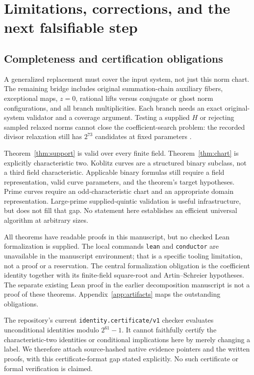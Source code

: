 \section{Limitations, corrections, and the next falsifiable step}
\subsection{Completeness and certification obligations}
A generalized replacement must cover the input system, not just this norm
chart. The remaining bridge includes original summation-chain auxiliary
fibers, exceptional maps, $z=0$, rational lifts versus conjugate or
ghost norm configurations, and all branch multiplicities. Each branch
needs an exact original-system validator and a coverage argument. Testing
a supplied $H$ or rejecting sampled relaxed norms cannot close the
coefficient-search problem: the recorded divisor relaxation still has
$2^{73}$ candidates at fixed parameters .

Theorem~\ref{thm:support} is valid over every finite field.
Theorem~\ref{thm:chart} is explicitly characteristic two. Koblitz curves are
a structured binary subclass, not a third field characteristic. Applicable
binary formulas still require a field representation, valid curve parameters,
and the theorem's target hypotheses. Prime curves require an odd-characteristic
chart and an appropriate domain representation. Large-prime supplied-quintic
validation is useful infrastructure, but does not fill that gap.
No statement here establishes an efficient universal algorithm at arbitrary
sizes.

All theorems have readable proofs in this manuscript, but no checked Lean
formalization is supplied. The local commands \texttt{lean} and
\texttt{conductor} are unavailable in the manuscript environment; that is a
specific tooling limitation, not a proof or a reservation. The central
formalization obligation is the coefficient identity together with its
finite-field square-root and Artin--Schreier hypotheses. The separate existing
Lean proof in the earlier decomposition manuscript is not a proof of these
theorems. Appendix~\ref{app:artifacts} maps the outstanding obligations.

The repository's current \texttt{identity.certificate/v1} checker evaluates
unconditional identities modulo $2^{61}-1$. It cannot faithfully certify the
characteristic-two identities or conditional implications here by merely
changing a label. We therefore attach source-hashed native evidence pointers
and the written proofs, with this certificate-format gap stated explicitly.
No such certificate or formal verification is claimed.

